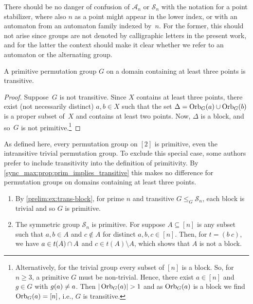 There should be no danger of confusion of $\mathcal A_n$
or $\mathcal S_n$ with the notation for a point stabilizer, where
also $n$ as a point might appear in the lower index, or 
with an automaton from an automaton family indexed by~$n$.
For the former, this should not arise since 
groups are not denoted by calligraphic letters in the present work,
and for the latter the context should make it clear whether
we refer to an automaton or the alternating group.
	
\begin{proposition}
	\label{sync_max:prop:prim_implies_transitive}
	A primitive permutation group $G$ 
	on a domain containing at least three points
	is transitive.
\end{proposition}
\begin{proof}
	Suppose~$G$ is not transitive.
	Since $X$ contains at least three points,
	there exist (not necessarily distinct) $a,b \in X$
	such that the set $\Delta = \Orbit{a}{G} \cup \Orbit{b}{G}$
	is a proper subset of~$X$ and contains at least two points.
	Now, $\Delta$ is a block, and so~$G$
	is not primitive.\footnote{Alternatively, for the trivial group every subset of $[n]$ is a block.
		So, for $n \ge 3$, a primitive $G$ must be non-trivial.
		Hence, there exist $a \in [n]$
		and $g \in G$ with $\applyfunc{a}{g} \ne a$.
		Then $|\Orbit{a}{G}| > 1$
		and as $\Orbit{a}{G}$ is a block 
		we find $\Orbit{a}{G} = [n]$, i.e., $G$ is transitive.}
\end{proof}

As defined here, every permutation group on $[2]$ is primitive, even 
the intransitive trivial permutation group. To exclude this special case,
some authors prefer to include transitivity into the definition of primitivity.
By \cref{sync_max:prop:prim_implies_transitive} this makes no difference
for permutation groups on domains containing at least three points.

\begin{example}\label{sync_max:ex:primitivegrps}
	\begin{enumerate}
		\item By \cref{prelim:ex:trans-block},
		for prime $n$ and transitive $G \le_G \mathcal S_n$, each block is trivial
		and so $G$ is primitive. 
		
		\item \label{sync_max:ex:primitivegrps:2} The symmetric group $\mathcal S_n$ is primitive.
		For suppose $A \subseteq [n]$ is any subset
		such that $a,b \in A$ and $c \notin A$ for distinct $a,b,c \in [n]$.
		Then, for $t = (b ~ c)$, we have $a \in \applyfunc{A}{t} \cap A$
		and $c \in t(A) \setminus A$, which shows that $A$
		is not a block. 
	\end{enumerate}
\end{example} 

